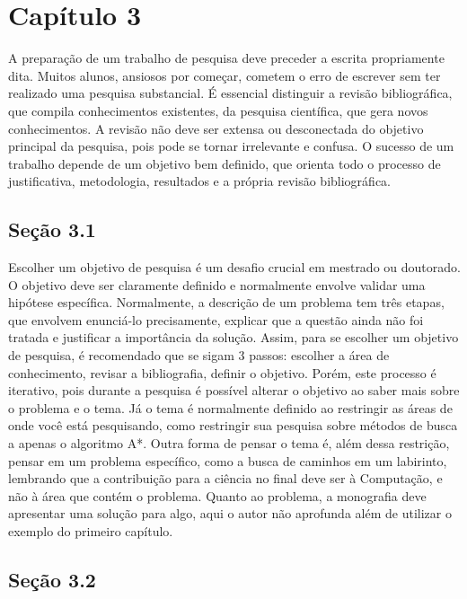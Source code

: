 \documentclass[
	12pt,				%
	openright,			%
	oneside,			%
	a4paper,			%
	chapter=TITLE,		%
	subsection=TITLE,	%
	english,			%
	brazilian,				%
	]{abntex2}
\begin{document}
\section*{Capítulo 3}
A preparação de um trabalho de pesquisa deve preceder a escrita propriamente dita. Muitos alunos, ansiosos por começar, cometem o erro de escrever sem ter realizado uma pesquisa substancial. É essencial distinguir a revisão bibliográfica, que compila conhecimentos existentes, da pesquisa científica, que gera novos conhecimentos. A revisão não deve ser extensa ou desconectada do objetivo principal da pesquisa, pois pode se tornar irrelevante e confusa. O sucesso de um trabalho depende de um objetivo bem definido, que orienta todo o processo de justificativa, metodologia, resultados e a própria revisão bibliográfica.

\subsection*{Seção 3.1}
Escolher um objetivo de pesquisa é um desafio crucial em mestrado ou doutorado. O objetivo deve ser claramente definido e normalmente envolve validar uma hipótese específica.
Normalmente, a descrição de um problema tem três etapas, que envolvem enunciá-lo precisamente, explicar que a questão ainda não foi tratada e justificar a importância da solução.
Assim, para se escolher um objetivo de pesquisa, é recomendado que se sigam 3 passos: escolher a área de conhecimento, revisar a bibliografia, definir o objetivo. Porém, este processo é iterativo, pois durante a pesquisa é possível alterar o objetivo ao saber mais sobre o problema e o tema.
Já o tema é normalmente definido ao restringir as áreas de onde você está pesquisando, como restringir sua pesquisa sobre métodos de busca a apenas o algoritmo A*. Outra forma de pensar o tema é, além dessa restrição, pensar em um problema específico, como a busca de caminhos em um labirinto, lembrando que a contribuição para a ciência no final deve ser à Computação, e não à área que contém o problema.
Quanto ao problema, a monografia deve apresentar uma solução para algo, aqui o autor não aprofunda além de utilizar o exemplo do primeiro capítulo.

\subsection*{Seção 3.2}
\end{document}

